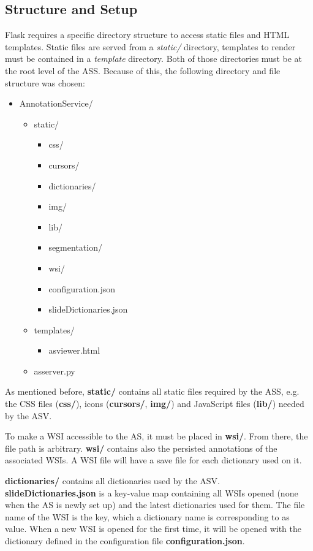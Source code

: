 \subsection{Structure and Setup}
\label{sec4_setup}
Flask requires a specific directory structure to access static files and HTML templates. Static files are served from a \emph{static/} directory, templates to render must be contained in a \emph{template} directory. Both of those directories must be at the root level of the ASS\cite{web:flask}. Because of this, the following directory and file structure was chosen:\clearpage
\begin{itemize}
	\item AnnotationService/
	\begin{itemize}
		\item static/
		\begin{itemize}
			\item css/
			\item cursors/
			\item dictionaries/
			\item img/
			\item lib/
			\item segmentation/
			\item wsi/
			\item configuration.json
			\item slideDictionaries.json
		\end{itemize}
		\item templates/
		\begin{itemize}
			\item as{\textunderscore}viewer.html
		\end{itemize}
		\item as{\textunderscore}server.py
	\end{itemize}
\end{itemize}

As mentioned before, \textbf{static/} contains all static files required by the ASS, e.g. the CSS files (\textbf{css/}), icons (\textbf{cursors/}, \textbf{img/}) and JavaScript files (\textbf{lib/}) needed by the ASV.

To make a WSI accessible to the AS, it must be placed in \textbf{wsi/}. From there, the file path is arbitrary. \textbf{wsi/} contains also the persisted annotations of the associated WSIs. A WSI file will have a save file for each dictionary used on it.

\textbf{dictionaries/} contains all dictionaries used by the ASV. \textbf{slideDictionaries.json} is a key-value map containing all WSIs opened (none when the AS is newly set up) and the latest dictionaries used for them. The file name of the WSI is the key, which a dictionary name is corresponding to as value. When a new WSI is opened for the first time, it will be opened with the dictionary defined in the configuration file \textbf{configuration.json}.

